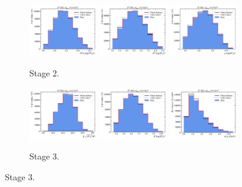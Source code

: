 \begin{figure}[htb]
    \begin{subfigure}{\textwidth}
        \centering
        \includegraphics[width=0.32\textwidth]{./figs-mc-correction/reweighting-final/plot_step1-D0_iso-b_log_fd_chi2.pdf}
        \includegraphics[width=0.32\textwidth]{./figs-mc-correction/reweighting-final/plot_step1-D0_iso-d0_log_ip_chi2.pdf}
        \includegraphics[width=0.32\textwidth]{./figs-mc-correction/reweighting-final/plot_step1-D0_iso-mu_log_ip_chi2.pdf}
        \caption{Stage 2.}
    \end{subfigure}

    \begin{subfigure}{\textwidth}
        \centering
        \includegraphics[width=0.32\textwidth]{./figs-mc-correction/reweighting-final/plot_step2-D0_iso-k_comp.pdf}
        \includegraphics[width=0.32\textwidth]{./figs-mc-correction/reweighting-final/plot_step2-D0_iso-k_log_ip_chi2.pdf}
        \includegraphics[width=0.32\textwidth]{./figs-mc-correction/reweighting-final/plot_step2-D0_iso-k_pt.pdf}
        \caption{Stage 3.}
    \end{subfigure}


\end{figure}
